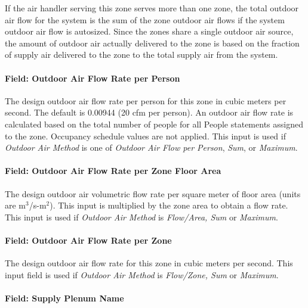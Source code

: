 If the air handler serving this zone serves more than one zone, the total outdoor air flow for the system is the sum of the zone outdoor air flows if the system outdoor air flow is autosized. Since the zones share a single outdoor air source, the amount of outdoor air actually delivered to the zone is based on the fraction of supply air delivered to the zone to the total supply air from the system.

\paragraph{Field: Outdoor Air Flow Rate per Person}\label{field-outdoor-air-flow-rate-per-person-7}

The design outdoor air flow rate per person for this zone in cubic meters per second. The default is 0.00944 (20 cfm per person). An outdoor air flow rate is calculated based on the total number of people for all People statements assigned to the zone. Occupancy schedule values are not applied. This input is used if \emph{Outdoor Air Method} is one of \emph{Outdoor Air Flow per Person}, \emph{Sum}, or \emph{Maximum}.

\paragraph{Field: Outdoor Air Flow Rate per Zone Floor Area}\label{field-outdoor-air-flow-rate-per-zone-floor-area-7}

The design outdoor air volumetric flow rate per square meter of floor area (units are m\(^{3}\)/s-m\(^{2}\)). This input is multiplied by the zone area to obtain a flow rate. This input is used if \emph{Outdoor Air Method} is \emph{Flow/Area, Sum} or \emph{Maximum}.

\paragraph{Field: Outdoor Air Flow Rate per Zone}\label{field-outdoor-air-flow-rate-per-zone-7}

The design outdoor air flow rate for this zone in cubic meters per second. This input field is used if \emph{Outdoor Air Method} is \emph{Flow/Zone, Sum} or \emph{Maximum}.

\paragraph{Field: Supply Plenum Name}\label{field-supply-plenum-name}

